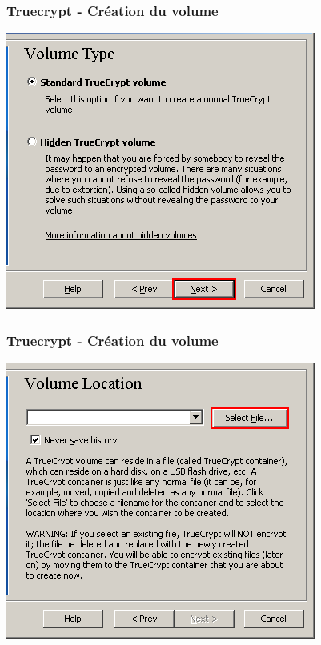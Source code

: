 \documentclass{beamer}
\begin{document}
\begin{frame}
\frametitle{Truecrypt - Création du volume}
\begin{center}
\includegraphics[scale=0.5] {./images/Truecrypt03.png} 
\end{center}
\end{frame}
\begin{frame}
\frametitle{Truecrypt - Création du volume}
\begin{center}
\includegraphics[scale=0.5] {./images/Truecrypt04.png} 
\end{center}
\end{frame}
\end{document}
